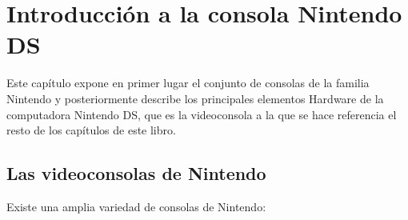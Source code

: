 \chapter{Introducción a la consola Nintendo DS}

Este capítulo expone en primer lugar el conjunto de consolas de la familia Nintendo y posteriormente describe los principales elementos Hardware de la computadora Nintendo DS, que es la videoconsola a la que se hace referencia el resto de los capítulos de este libro.

\section{Las videoconsolas de Nintendo}

Existe una amplia variedad de consolas de Nintendo:

